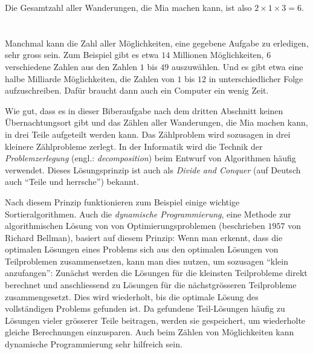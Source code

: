{{Die Gesamtzahl aller Wanderungen, die Mia machen kann, ist also ${2 \times 1 \times 3 = 6}$.



\section*{\BrochureItsInformatics}
Manchmal kann die Zahl aller Möglichkeiten, eine gegebene Aufgabe zu erledigen, sehr gross sein.  Zum Beispiel gibt es etwa $14$ Millionen Möglichkeiten, $6$ verschiedene Zahlen aus den Zahlen $1$ bis $49$ auszuwählen.  Und es gibt etwa eine halbe Milliarde Möglichkeiten, die Zahlen von $1$ bis $12$ in unterschiedlicher Folge aufzuschreiben.  Dafür braucht dann auch ein Computer ein wenig Zeit.

Wie gut, dass es in dieser Biberaufgabe nach dem dritten Abschnitt keinen Übernachtungsort gibt und das Zählen aller Wanderungen, die Mia machen kann, in drei Teile aufgeteilt werden kann.  Das Zählproblem wird sozusagen in drei kleinere Zählprobleme zerlegt.  In der Informatik wird die Technik der \emph{Problemzerlegung} (engl.: \emph{decomposition}) beim Entwurf von Algorithmen häufig verwendet.  Dieses Lösungsprinzip ist auch als \emph{Divide and Conquer} (auf Deutsch auch \enquote{Teile und herrsche}) bekannt.

Nach diesem Prinzip funktionieren zum Beispiel einige wichtige Sortieralgorithmen.  Auch die \emph{dynamische Programmierung}, eine Methode zur algorithmischen Lösung von von Optimierungsproblemen (beschrieben $1957$ von Richard Bellman), basiert auf diesem Prinzip:  Wenn man erkennt, dass die optimalen Lösungen eines Problems sich aus den optimalen Lösungen von Teilproblemen zusammensetzen, kann man dies nutzen, um sozusagen \enquote{klein anzufangen}:  Zunächst werden die Lösungen für die kleinsten Teilprobleme direkt berechnet und anschliessend zu Lösungen für die nächstgrösseren Teilprobleme zusammengesetzt.  Dies wird wiederholt, bis die optimale Lösung des vollständigen Problems gefunden ist.  Da gefundene Teil-Lösungen häufig zu Lösungen vieler grösserer Teile beitragen, werden sie gespeichert, um wiederholte gleiche Berechnungen einzusparen.  Auch beim Zählen von Möglichkeiten kann dynamische Programmierung sehr hilfreich sein.



}}
